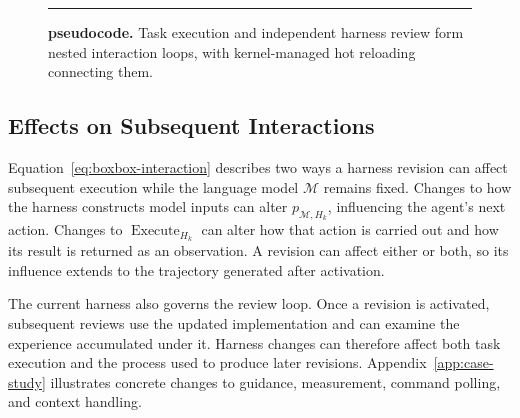 \begin{figure}[H]
\begin{minipage}{\linewidth}
\begin{pseudocode}
\end{pseudocode}
\vspace{4pt}\hrule
\end{minipage}
\endgroup
  \caption{\textbf{\boxbox{} pseudocode.} Task execution and independent harness review form nested interaction loops, with kernel-managed hot reloading connecting them.}
  \label{fig:boxbox-pseudocode}
\end{figure}

\subsection{Effects on Subsequent Interactions}
\label{app:boxbox-update-effects}

Equation~\ref{eq:boxbox-interaction} describes two ways a harness revision
can affect subsequent execution while the language model $\mathcal{M}$ remains
fixed. Changes to how the harness constructs model inputs can alter
$p_{\mathcal{M},H_k}$, influencing the agent's next action. Changes to
$\operatorname{Execute}_{H_k}$ can alter how that action is carried out and how
its result is returned as an observation. A revision can affect either or
both, so its influence extends to the trajectory generated after activation.

The current harness also governs the review loop. Once a revision is
activated, subsequent reviews use the updated implementation and can examine
the experience accumulated under it. Harness changes can therefore affect
both task execution and the process used to produce later revisions.
Appendix~\ref{app:case-study} illustrates concrete changes to guidance,
measurement, command polling, and context handling.

